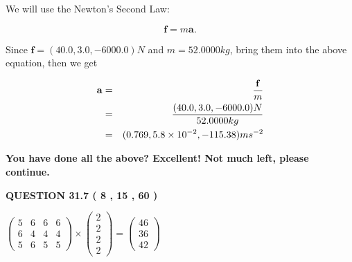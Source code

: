 \documentclass[12pt]{article}
\begin{document}
 
 
 
 
\noindent{}

We will use the Newton's Second Law:
 
\[
\mathbf{f}=m\mathbf{a}.
\]
 
Since $\mathbf{f}= %
(40.0 , 3.0 , -6000.0) N$
and $m= %
52.0000kg$, bring them into the above equation, then we get
 
\begin{eqnarray*}
\mathbf{a}&=&\frac{\mathbf{f}}m  \\
&=&\frac{ %
(40.0 , 3.0 , -6000.0) N}{ %
52.0000kg}  \\
&=& %
(0.769 , 5.8 \times 10^{-2} , -115.38) ms^{-2}
\end{eqnarray*}
 
 
 
   
   
\vspace{0.3in}
{\textbf{\LARGE{You have done all the above? Excellent! Not much left, please continue.}}}
\vspace{0.3in}
   
   
  
\vspace{0.2in}
  
{\textbf{\Large{QUESTION
31.7 
 (           8 ,          15 ,          60 )
}}}
  
  
 
 
\noindent{}

 
$\left( \begin{array}{ccccccccccccccc}
           5  & 
           6  & 
           6  & 
           6  \\ 
           6  & 
           4  & 
           4  & 
           4  \\ 
           5  & 
           6  & 
           5  & 
           5
\end{array}\right) \times
\left( \begin{array}{c}
           2  \\ 
           2  \\ 
           2  \\ 
           2
\end{array}\right)  =
\left( \begin{array}{c}
          46  \\ 
          36  \\ 
          42
\end{array}\right)  $
 
\end{document}
